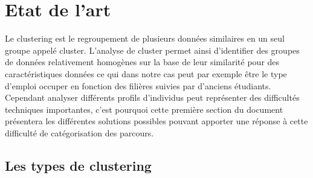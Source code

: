 \documentclass[memoire.tex]{subfiles}
\begin{document}
\chapter{Etat de l'art}
Le clustering est le regroupement de plusieurs données similaires en un seul groupe appelé cluster. L'analyse de cluster permet ainsi d'identifier des groupes de données relativement homogènes sur la base de leur similarité pour des caractéristiques données ce qui dans notre cas peut par exemple être le type d'emploi occuper en fonction des filières suivies par d'anciens étudiants. Cependant analyser différents profils d'individus peut représenter des difficultés techniques importantes, c'est pourquoi cette première section du document présentera les différentes solutions possibles pouvant apporter une réponse à cette difficulté de catégorisation des parcours. 
	\section{Les types de clustering}
\end{document}
